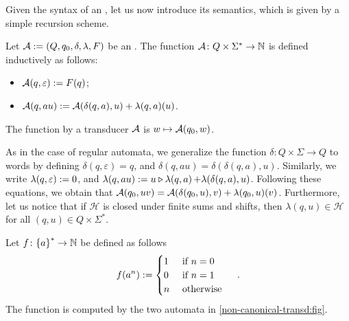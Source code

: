 Given the syntax of an , let us now 
introduce its semantics, which is given by a simple recursion
scheme.
\begin{definition}
    Let $\aTransd \defined (Q,q_0, \delta, \lambda, F)$ be an .
    The function
    $\aTransd \colon Q \times \Sigma^* \to \Nat$
    is defined inductively  as follows:
    \begin{itemize}
        \item $\aTransd(q, \varepsilon) \defined F(q)$;
        \item $\aTransd(q, a u) \defined \aTransd(\delta(q,a), u)
            + \lambda(q,a)(u)$.
    \end{itemize}
    The function  by a transducer $\aTransd$
    is $w \mapsto \aTransd(q_0, w)$.
\end{definition}

\AP As in the case of regular automata, we generalize the function $\delta
\colon Q \times \Sigma \to Q$ to words by defining $\delta(q, \varepsilon) =
q$, and $\delta(q,au) = \delta(\delta(q,a), u)$. Similarly, we write
$\lambda(q,\varepsilon) \defined 0$, and $\lambda(q, au) \defined \app{\lambda(q,a)}{u}
+ \lambda(\delta(q,a), u)$. Following these equations, we obtain that
$\aTransd(q_0, uv) = \aTransd(\delta(q_0, u), v) + \lambda(q_0, u)(v)$.
Furthermore, let us notice that if $\mathcal{H}$ is closed under finite sums
and shifts, then $\lambda(q, u) \in \mathcal{H}$ for all $(q,u) \in Q \times
\Sigma^*$.

\begin{example}
    \label{non-canonical-transd:ex}
    Let $f \colon \set{a}^* \to \Nat$
    be defined as follows
    \begin{equation*}
        f(a^n) \defined
        \begin{cases}
            1 & \text{ if } n = 0 \\
            0 & \text{ if } n = 1 \\
            n & \text{ otherwise }
        \end{cases}
        \quad .
    \end{equation*}
    The function is computed by the two automata
    in \cref{non-canonical-transd:fig}.
\end{example}

